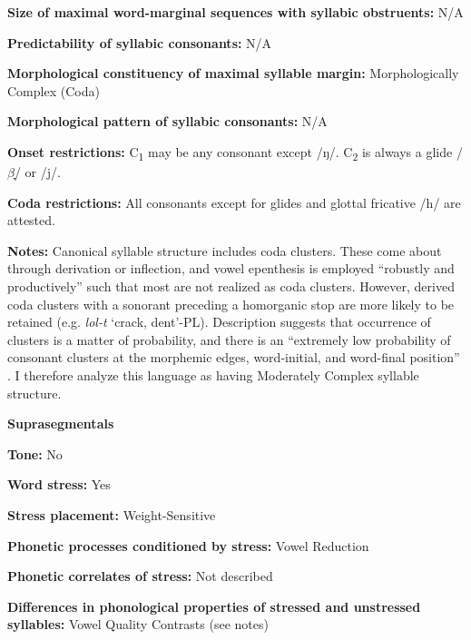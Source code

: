 \textbf{Size of maximal word{}-marginal sequences with syllabic obstruents:} N/A



\textbf{Predictability of syllabic consonants:} N/A



\textbf{Morphological constituency of maximal syllable margin:} Morphologically Complex (Coda)



\textbf{Morphological pattern of syllabic consonants:} N/A



\textbf{Onset restrictions:} C\textsubscript{1} may be any consonant except /ŋ/. C\textsubscript{2} is always a glide /$\beta ̞$/ or /j/.



\textbf{Coda restrictions:} All consonants except for glides and glottal fricative /h/ are attested. 



\textbf{Notes:} Canonical syllable structure includes coda clusters. These come about through derivation or inflection, and vowel epenthesis is employed “robustly and productively” such that most are not realized as coda clusters. However, derived coda clusters with a sonorant preceding a homorganic stop are more likely to be retained (e.g. \textit{lol-t} ‘crack, dent’-PL). Description suggests that occurrence of clusters is a matter of probability, and there is an “extremely low probability of consonant clusters at the morphemic edges, word-initial, and word-final position” \citep[55]{Filchenko2007}. I therefore analyze this language as having Moderately Complex syllable structure.



\textbf{Suprasegmentals}



\textbf{Tone:} No



\textbf{Word stress:} Yes



\textbf{Stress placement:} Weight-Sensitive



\textbf{Phonetic processes conditioned by stress:} Vowel Reduction



\textbf{Phonetic correlates of stress:} Not described



\textbf{Differences in phonological properties of stressed and unstressed syllables:} Vowel Quality Contrasts (see notes)



